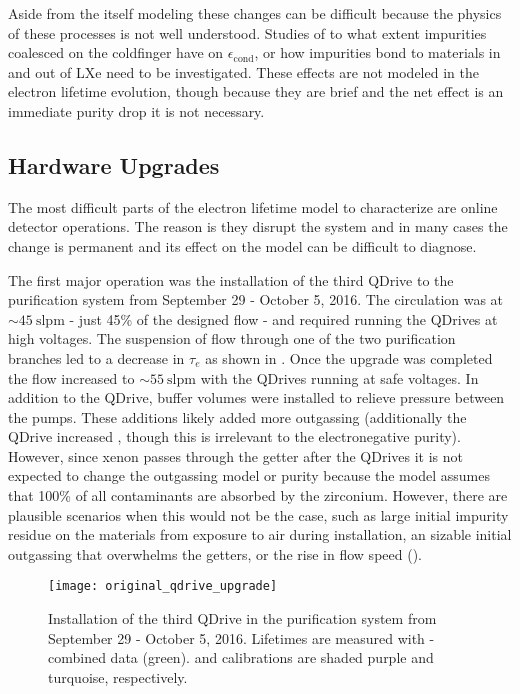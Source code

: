 Aside from the itself modeling these changes can be difficult because the physics of these processes is not well understood.  Studies
of to what extent impurities coalesced on the coldfinger have on $\epsilon_{\mathrm{cond}}$, or how impurities bond to materials in and
out of LXe need to be investigated.  These effects are not modeled in the electron lifetime evolution, though because they are brief and
the net effect is an immediate purity drop it is not necessary.



\subsection{Hardware Upgrades}
\label{subsec:electron_lifetime_model_ops}
The most difficult parts of the electron lifetime model to characterize are online detector operations.  The reason is they disrupt the
system and in many cases the change is permanent and its effect on the model can be difficult to diagnose.

The first major operation was the installation of the third QDrive to the purification system from September 29 - October 5, 2016.  The
circulation was at ${\sim} 45\ \mathrm{slpm}$ - just 45\% of the designed flow - and required running the QDrives at high voltages.  The
suspension of flow through one of the two purification branches led to a decrease in $\tau_e$ as shown in
.  Once the upgrade was completed the flow increased to
${\sim}55\ \mathrm{slpm}$ with
the QDrives running at safe voltages.  In addition to the QDrive, buffer volumes were installed to relieve pressure between
the pumps.  These additions likely added more outgassing
(additionally the QDrive increased , though this is irrelevant to the electronegative purity).  However, since xenon passes
through the
getter after the QDrives it is not expected to change the outgassing model or purity because the model assumes that 100\% of all
contaminants are
absorbed by the zirconium.  However, there are plausible scenarios when this would not be the case, such as large initial impurity residue
on the materials from exposure to air during installation, an sizable initial outgassing that overwhelms the getters, or the rise
in flow speed ().

\begin{figure}
\centering
\texttt{[image: original\_qdrive\_upgrade]}
\caption{Installation of the third QDrive in the purification system from September 29 - October 5, 2016.  Lifetimes are measured
with - combined data (green).   and \ambe calibrations are shaded purple and turquoise,
respectively.}
\label{fig:electron_lifetime_model_ops_original_qdrive_upgrade}
\end{figure}

